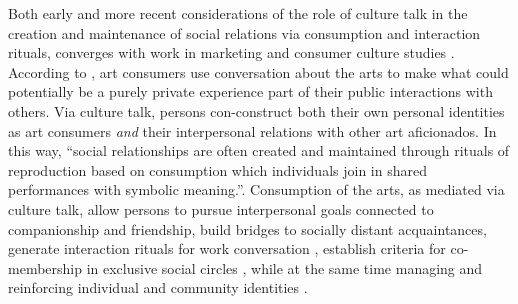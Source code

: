 Both early \citep{dimaggio87, fine77} and more recent \citep{long03, benzecry_collins14} considerations of the role of culture talk in the creation and maintenance of social relations via consumption and interaction rituals, converges with work in marketing and consumer culture studies \citep{deighton92, gainer95}. According to \citet{gainer95}, art consumers use conversation about the arts to make what could potentially be a purely private experience part of their public interactions with others. Via culture talk, persons con-construct both their own personal identities as art consumers \emph{and} their interpersonal relations with other art aficionados. In this way, ``social relationships are often created and maintained through rituals of reproduction based on consumption which individuals join in shared performances with symbolic meaning.''\citep[254]{gainer95}. Consumption of the arts, as mediated via culture talk, allow persons to pursue interpersonal goals connected to companionship and friendship, build bridges to socially distant acquaintances, generate interaction rituals for work conversation \citep{lizardo13}, establish criteria for co-membership in exclusive social circles \citep{kadushin66}, while at the same time managing and reinforcing individual and community identities \citep[255-257]{gainer95}. 

